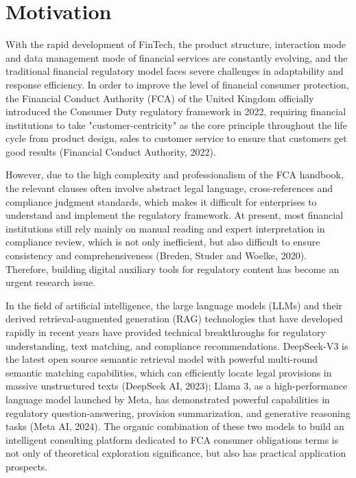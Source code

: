 \documentclass[a4paper,11pt]{article}
\begin{document}
\section{Motivation}

With the rapid development of FinTech, the product structure, interaction mode and data management mode of financial services are constantly evolving, and the traditional financial regulatory model faces severe challenges in adaptability and response efficiency. In order to improve the level of financial consumer protection, the Financial Conduct Authority (FCA) of the United Kingdom officially introduced the Consumer Duty regulatory framework in 2022, requiring financial institutions to take "customer-centricity" as the core principle throughout the life cycle from product design, sales to customer service to ensure that customers get good results (Financial Conduct Authority, 2022).

However, due to the high complexity and professionalism of the FCA handbook, the relevant clauses often involve abstract legal language, cross-references and compliance judgment standards, which makes it difficult for enterprises to understand and implement the regulatory framework. At present, most financial institutions still rely mainly on manual reading and expert interpretation in compliance review, which is not only inefficient, but also difficult to ensure consistency and comprehensiveness (Breden, Studer and Woelke, 2020). Therefore, building digital auxiliary tools for regulatory content has become an urgent research issue.

In the field of artificial intelligence, the large language models (LLMs) and their derived retrieval-augmented generation (RAG) technologies that have developed rapidly in recent years have provided technical breakthroughs for regulatory understanding, text matching, and compliance recommendations. DeepSeek-V3 is the latest open source semantic retrieval model with powerful multi-round semantic matching capabilities, which can efficiently locate legal provisions in massive unstructured texts (DeepSeek AI, 2023); Llama 3, as a high-performance language model launched by Meta, has demonstrated powerful capabilities in regulatory question-answering, provision summarization, and generative reasoning tasks (Meta AI, 2024). The organic combination of these two models to build an intelligent consulting platform dedicated to FCA consumer obligations terms is not only of theoretical exploration significance, but also has practical application prospects.
\end{document}
